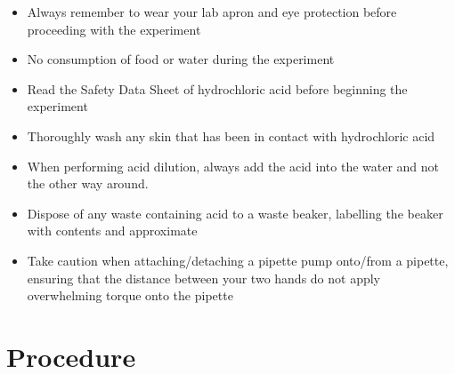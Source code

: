 \documentclass[11pt, letterpaper]{article}
\begin{document}
\begin{paracol}{2}
    \begin{itemize}
        \item Always remember to wear your lab apron and eye protection before proceeding with the experiment
        \item No consumption of food or water during the experiment
        \item Read the Safety Data Sheet of hydrochloric acid before beginning the experiment
        \item Thoroughly wash any skin that has been in contact with hydrochloric acid
    \end{itemize}
    \switchcolumn
    \begin{itemize}
        \item When performing acid dilution, always add the acid into the water and not the other way around.
        \item Dispose of any waste containing acid to a waste beaker, labelling the beaker with contents and approximate \ce{[H+]}
        \item Take caution when attaching/detaching a pipette pump onto/from a pipette, ensuring that the distance between your two hands do not apply overwhelming torque onto the pipette
    \end{itemize}
\end{paracol}

\section{Procedure}
\end{document}

